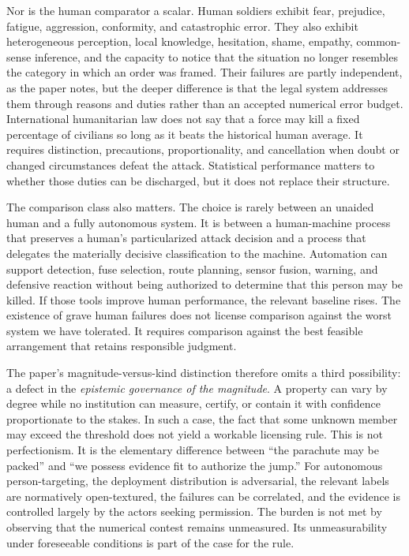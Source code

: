 \documentclass[11pt]{article}
\begin{document}
Nor is the human comparator a scalar. Human soldiers exhibit fear, prejudice, fatigue, aggression, conformity, and catastrophic error. They also exhibit heterogeneous perception, local knowledge, hesitation, shame, empathy, common-sense inference, and the capacity to notice that the situation no longer resembles the category in which an order was framed. Their failures are partly independent, as the paper notes, but the deeper difference is that the legal system addresses them through reasons and duties rather than an accepted numerical error budget. International humanitarian law does not say that a force may kill a fixed percentage of civilians so long as it beats the historical human average. It requires distinction, precautions, proportionality, and cancellation when doubt or changed circumstances defeat the attack. Statistical performance matters to whether those duties can be discharged, but it does not replace their structure.

The comparison class also matters. The choice is rarely between an unaided human and a fully autonomous system. It is between a human-machine process that preserves a human's particularized attack decision and a process that delegates the materially decisive classification to the machine. Automation can support detection, fuse selection, route planning, sensor fusion, warning, and defensive reaction without being authorized to determine that this person may be killed. If those tools improve human performance, the relevant baseline rises. The existence of grave human failures does not license comparison against the worst system we have tolerated. It requires comparison against the best feasible arrangement that retains responsible judgment.

The paper's magnitude-versus-kind distinction therefore omits a third possibility: a defect in the \emph{epistemic governance of the magnitude}. A property can vary by degree while no institution can measure, certify, or contain it with confidence proportionate to the stakes. In such a case, the fact that some unknown member may exceed the threshold does not yield a workable licensing rule. This is not perfectionism. It is the elementary difference between ``the parachute may be packed'' and ``we possess evidence fit to authorize the jump.'' For autonomous person-targeting, the deployment distribution is adversarial, the relevant labels are normatively open-textured, the failures can be correlated, and the evidence is controlled largely by the actors seeking permission. The burden is not met by observing that the numerical contest remains unmeasured. Its unmeasurability under foreseeable conditions is part of the case for the rule.
\end{document}
